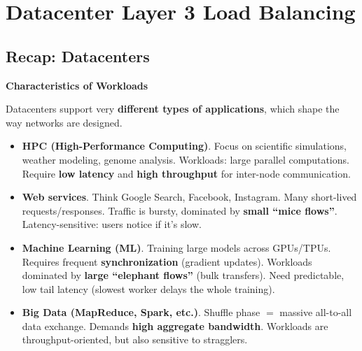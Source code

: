 \section{Datacenter Layer 3 Load Balancing}

\subsection{Recap: Datacenters}

\begin{flushleft}
    \textcolor{Green3}{ \textbf{Characteristics of Workloads}}
\end{flushleft}
Datacenters support very \textbf{different types of applications}, which shape the way networks are designed.
\begin{itemize}
    \item \textbf{HPC (High-Performance Computing)}. Focus on scientific simulations, weather modeling, genome analysis. Workloads: large parallel computations. Require \textbf{low latency} and \textbf{high throughput} for inter-node communication.
    \item \textbf{Web services}. Think Google Search, Facebook, Instagram. Many short-lived requests/responses. Traffic is bursty, dominated by \textbf{small ``mice flows''}. Latency-sensitive: users notice if it's slow.
    \item \textbf{Machine Learning (ML)}. Training large models across GPUs/TPUs. Requires frequent \textbf{synchronization} (gradient updates). Workloads dominated by \textbf{large ``elephant flows''} (bulk transfers). Need predictable, low tail latency (slowest worker delays the whole training).
    \item \textbf{Big Data (MapReduce, Spark, etc.)}. Shuffle phase $=$ massive all-to-all data exchange. Demands \textbf{high aggregate bandwidth}. Workloads are throughput-oriented, but also sensitive to stragglers.
\end{itemize}

